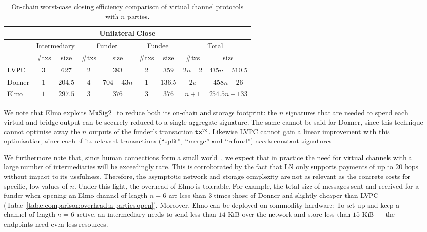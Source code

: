   \begin{table}[h!]
    \begin{minipage}{\textwidth}
    \centering
    \begin{tabular}{|l|c|c|c|c|c|c|c|c|}
    \hline
    \multicolumn{9}{|c|}{Unilateral Close} \\
    \hline
              & \multicolumn{2}{|c|}{Intermediary}
              & \multicolumn{2}{|c|}{Funder} & \multicolumn{2}{|c|}{Fundee}
              & \multicolumn{2}{|c|}{Total} \\
    \hline
              & \#txs & size & \#txs & size & \#txs & size & \#txs & size \\
    \hline
    LVPC      & $3$ & $627$ & $2$ & $383$ & $2$ & $359$ & $2n-2$ & $435n -
              510.5$ \\
    \hline
    Donner    & $1$ & $204.5$ & $4$ & $704 + 43n$ & $1$ & $136.5$ & $2n$ & $458n
              - 26$ \\
    \hline
    Elmo      & $1$ & $297.5$ & $3$ & $376$ & $3$ & $376$
              & $n+1$ & $254.5n-133$ \\
    \hline
    \end{tabular}
    \end{minipage}
    \caption{On-chain worst-case closing efficiency comparison of virtual
    channel protocols with $n$ parties.}
    \label{table:comparison:overhead:n-parties:close}
  \end{table}

  We note that Elmo exploits
  MuSig2~\cite{DBLP:journals/dcc/MaxwellPSW19,DBLP:conf/crypto/NickRS21} to
  reduce both its
  on-chain and storage footprint: the $n$ signatures that are needed to spend
  each virtual and bridge output can be securely reduced to a single aggregate
  signature. The same cannot be said for
  Donner, since this technique cannot optimise away the $n$ outputs of the
  funder's transaction $\texttt{tx}^{\mathtt{vc}}$. Likewise LVPC cannot gain a linear
  improvement with this optimisation, since each of its relevant transactions
  (``split'', ``merge'' and ``refund'') needs constant signatures.

  We furthermore note that, since human connections form a
  small world~\cite{smallworld}, we expect that in practice the
  need for virtual channels with a large number of
  intermediaries will be exceedingly rare. This is corroborated by
  the fact that LN only supports payments of up to $20$ hops
  without impact to its usefulness. Therefore, the asymptotic
  network and storage complexity are not as relevant as the
  concrete costs for specific, low values of $n$. Under this
  light, the overhead of Elmo is tolerable. For example, the
  total size of messages sent and received for a funder when opening an Elmo channel
  of length $n=6$ are less than $3$ times those of Donner and
  slightly cheaper than LVPC
  (Table~\ref{table:comparison:overhead:n-parties:open}).
  Moreover, Elmo can be deployed on commodity hardware: To set up
  and keep a channel of length $n=6$ active, an intermediary needs to send less
  than $14$ KiB over the network and store less than $15$ KiB --- the endpoints
  need even less resources.

